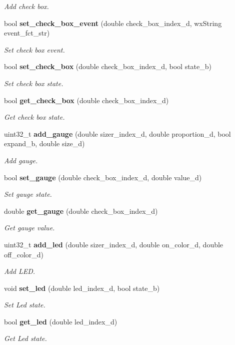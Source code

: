 \begin{DoxyCompactItemize}
\begin{DoxyCompactList}\small\item\em Add check box. \end{DoxyCompactList}\item 
bool \textbf{ set\+\_\+check\+\_\+box\+\_\+event} (double check\+\_\+box\+\_\+index\+\_\+d, wx\+String event\+\_\+fct\+\_\+str)
\begin{DoxyCompactList}\small\item\em Set check box event. \end{DoxyCompactList}\item 
bool \textbf{ set\+\_\+check\+\_\+box} (double check\+\_\+box\+\_\+index\+\_\+d, bool state\+\_\+b)
\begin{DoxyCompactList}\small\item\em Set check box state. \end{DoxyCompactList}\item 
bool \textbf{ get\+\_\+check\+\_\+box} (double check\+\_\+box\+\_\+index\+\_\+d)
\begin{DoxyCompactList}\small\item\em Get check box state. \end{DoxyCompactList}\item 
uint32\+\_\+t \textbf{ add\+\_\+gauge} (double sizer\+\_\+index\+\_\+d, double proportion\+\_\+d, bool expand\+\_\+b, double size\+\_\+d)
\begin{DoxyCompactList}\small\item\em Add gauge. \end{DoxyCompactList}\item 
bool \textbf{ set\+\_\+gauge} (double check\+\_\+box\+\_\+index\+\_\+d, double value\+\_\+d)
\begin{DoxyCompactList}\small\item\em Set gauge state. \end{DoxyCompactList}\item 
double \textbf{ get\+\_\+gauge} (double check\+\_\+box\+\_\+index\+\_\+d)
\begin{DoxyCompactList}\small\item\em Get gauge value. \end{DoxyCompactList}\item 
uint32\+\_\+t \textbf{ add\+\_\+led} (double sizer\+\_\+index\+\_\+d, double on\+\_\+color\+\_\+d, double off\+\_\+color\+\_\+d)
\begin{DoxyCompactList}\small\item\em Add L\+ED. \end{DoxyCompactList}\item 
void \textbf{ set\+\_\+led} (double led\+\_\+index\+\_\+d, bool state\+\_\+b)
\begin{DoxyCompactList}\small\item\em Set Led state. \end{DoxyCompactList}\item 
bool \textbf{ get\+\_\+led} (double led\+\_\+index\+\_\+d)
\begin{DoxyCompactList}\small\item\em Get Led state. \end{DoxyCompactList}\end{DoxyCompactItemize}


